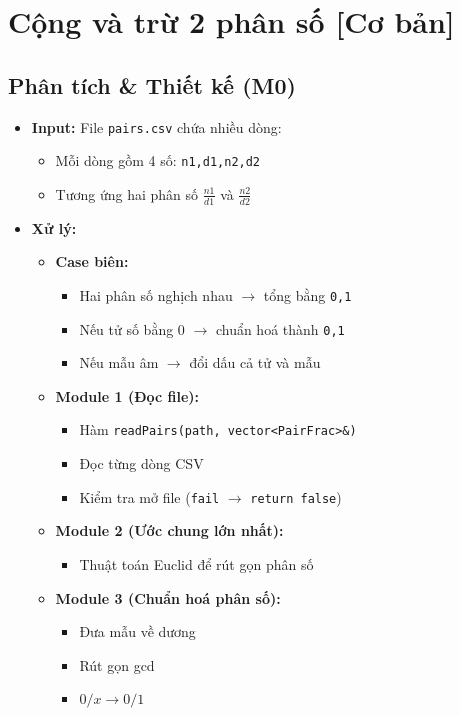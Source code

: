 \section{Cộng và trừ 2 phân số [Cơ bản]}
\subsection{Phân tích \& Thiết kế (M0)}
\begin{itemize}
    \item \textbf{Input:}
    File \texttt{pairs.csv} chứa nhiều dòng:
    \begin{itemize}
        \item Mỗi dòng gồm 4 số: \texttt{n1,d1,n2,d2}
        \item Tương ứng hai phân số $\frac{n1}{d1}$ và $\frac{n2}{d2}$
    \end{itemize}

    \item \textbf{Xử lý:}
    \begin{itemize}
        \item \textbf{Case biên:}
        \begin{itemize}
            \item Hai phân số nghịch nhau $\rightarrow$ tổng bằng \texttt{0,1}
            \item Nếu tử số bằng 0 $\rightarrow$ chuẩn hoá thành \texttt{0,1}
            \item Nếu mẫu âm $\rightarrow$ đổi dấu cả tử và mẫu
        \end{itemize}

        \item \textbf{Module 1 (Đọc file):}
        \begin{itemize}
            \item Hàm \texttt{readPairs(path, vector<PairFrac>\&)}
            \item Đọc từng dòng CSV
            \item Kiểm tra mở file (\texttt{fail} $\rightarrow$ \texttt{return false})
        \end{itemize}

        \item \textbf{Module 2 (Ước chung lớn nhất):}
        \begin{itemize}
            \item Thuật toán Euclid để rút gọn phân số
        \end{itemize}

        \item \textbf{Module 3 (Chuẩn hoá phân số):}
        \begin{itemize}
            \item Đưa mẫu về dương
            \item Rút gọn gcd
            \item $0/x \rightarrow 0/1$
        \end{itemize}


\end{itemize}
\end{itemize}
